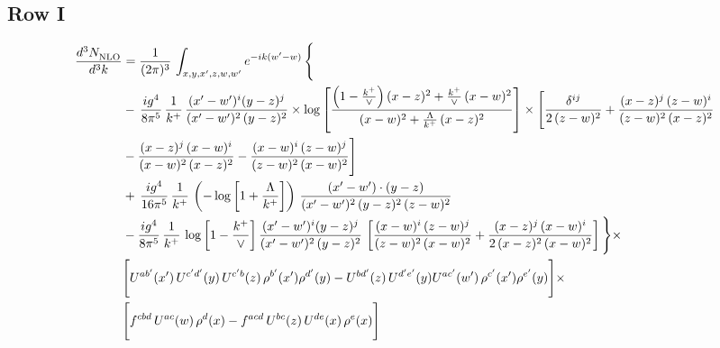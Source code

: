 \documentclass[9pt]{article}
\numberwithin{equation}{section}
\begin{document}
\subsection{Row I}
\begin{align}
     \frac{d^{3}N_{\rm NLO}^{\rm}}{d^{3}k}  & =  \frac{1}{(2\pi)^{3}}\, \int_{x,y,x',z,w,w^{\prime}} e^{-ik(w^{\prime}-w)}\, \Bigg\{\notag \\ & -\,\frac{ig^{4}}{8\pi^{5}}\,\frac{1}{k^{+}}\,\frac{(x'-w')^{i}(y-z)^{j}}{(x'-w')^{2}\,(y-z)^{2}}\times \log{\left[\frac{\left(1-\frac{k^{+}}{\vee}\right)(x-z)^{2}+\frac{k^{+}}{\vee}\,(x-w)^{2}}{(x-w)^{2}+\frac{\Lambda}{k^{+}}\,(x-z)^{2}}\right]}\times \Bigg[\frac{\delta^{ij}}{2\,(z-w)^{2}}+\frac{(x-z)^{j}\,(z-w)^{i}}{(z-w)^{2}\,(x-z)^{2}}\notag \\ & -\frac{(x-z)^{j}\,(x-w)^{i}}{(x-w)^{2}\,(x-z)^{2}}-\frac{(x-w)^{i}\,(z-w)^{j}}{(z-w)^{2}\,(x-w)^{2}}\Bigg]\notag \\ & +\,\frac{ig^{4}}{16\pi^{5}}\,\frac{1}{k^{+}}\,\left(-\log{\left[1+\frac{\Lambda}{k^{+}}\right]}\right)\, \frac{(x'-w')\cdot (y-z)}{(x'-w')^{2}\,(y-z)^{2}\,(z-w)^{2}}\notag \\ & -\frac{ig^{4}}{8\pi^{5}}\,\frac{1}{k^{+}}\, \log{\left[1-\frac{k^{+}}{\vee}\right]}\,\frac{(x'-w')^{i}(y-z)^{j}}{(x'-w')^{2}\,(y-z)^{2}}\,\left[\frac{(x-w)^{i}\,(z-w)^{j}}{(z-w)^{2}\,(x-w)^{2}}+\frac{(x-z)^{j}\,(x-w)^{i}}{2\,(x-z)^{2}\, (x-w)^{2}}\right]\Bigg\}\times \notag \\ &  \Bigg[U^{ab'}(x')\,U^{c'd'}(y)\,U^{c'b}(z)\,\rho^{b'}(x')\rho^{d'}(y)-U^{bd'}(z)\,U^{d'e'}(y)U^{ac'}(w')\,\rho^{c'}(x')\rho^{e'}(y)\Bigg]\times\notag \\ & \Bigg[f^{cbd}\,U^{ac}(w)\,\rho^{d}(x)-f^{acd}\, U^{bc}(z)\,U^{de}(x)\,\rho^{e}(x)\Bigg] 
\end{align}
\end{document}
